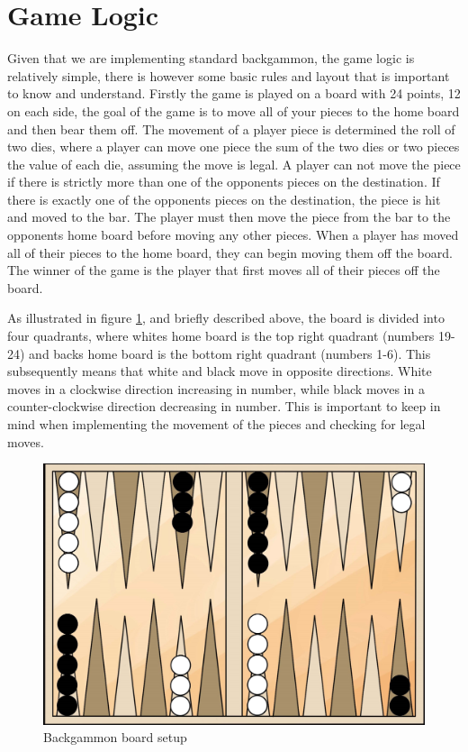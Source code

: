 \documentclass[ twoside,openright,titlepage,numbers=noenddot,headinclude,%
                footinclude=true,cleardoublepage=empty,abstractoff, %
                BCOR=5mm,paper=a4,fontsize=11pt,%
                ngerman,american,%
                ]{scrreprt}
\begin{document}
\section{Game Logic}
Given that we are implementing standard backgammon, the game logic is relatively simple, there is however some basic rules and layout that is important to know and understand. Firstly the game is played on a board with 24 points, 12 on each side, the goal of the game is to move all of your pieces to the home board and then bear them off. The movement of a player piece is determined the roll of two dies, where a player can move one piece the sum of the two dies or two pieces the value of each die, assuming the move is legal. A player can not move the piece if there is strictly more than one of the opponents pieces on the destination. If there is exactly one of the opponents pieces on the destination, the piece is hit and moved to the bar. The player must then move the piece from the bar to the opponents home board before moving any other pieces. When a player has moved all of their pieces to the home board, they can begin moving them off the board. The winner of the game is the player that first moves all of their pieces off the board.


As illustrated in figure \ref{fig:backgammon_board_setup}, and briefly described above, the board is divided into four quadrants, where whites home board is the top right quadrant (numbers 19-24) and backs home board is the bottom right quadrant (numbers 1-6). This subsequently means that white and black move in opposite directions. White moves in a clockwise direction increasing in number, while black moves in a counter-clockwise direction decreasing in number. This is important to keep in mind when implementing the movement of the pieces and checking for legal moves.



\begin{figure}[H]
    \centering
    \includegraphics[width=1\textwidth]{gfx/Backgammon-setup.jpg}
    \caption{Backgammon board setup}
    \label{fig:backgammon_board_setup}
\end{figure}
\end{document}
